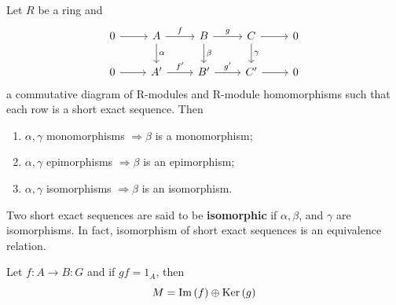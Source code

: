 \documentclass[12pt, oneside]{book}
\begin{document}
\begin{theorem}
    Let $R$ be a ring and
    \begin{equation*}
        \begin{tikzcd}
            0 \arrow[r] & A \arrow[r, "f"] \arrow[d,"\alpha"] & B \arrow[r, "g"] \arrow[d,"\beta"] & C \arrow[r] \arrow[d, "\gamma"] & 0 \\
            0 \arrow[r] & A' \arrow[r, "f'"] & B' \arrow[r, "g'"]   & C' \arrow[r]       & 0
        \end{tikzcd}
    \end{equation*}
    a commutative diagram of R-modules and R-module homomorphisms such that each row is a short exact sequence. Then
    \begin{enumerate}
        \item
              $\alpha, \gamma$ monomorphisms $\Rightarrow \beta$ is a monomorphism;

        \item
              $\alpha, \gamma$ epimorphisms $\Rightarrow \beta$ is an epimorphism;

        \item
              $\alpha, \gamma$ isomorphisms $\Rightarrow \beta$ is an isomorphism.
    \end{enumerate}
    \begin{remark}
        Two short exact sequences are said to be \textbf{isomorphic} if $\alpha, \beta$, and $\gamma$ are isomorphisms.
        In fact, isomorphism of short exact sequences is an equivalence relation.
    \end{remark}
\end{theorem}








\begin{lemma}
    Let $f:A\rightarrow B:G$ and if $gf=1_A$, then
    \begin{equation*}
        M=\Im\left( f \right)\oplus\operatorname{\operatorname{Ker}}\left( g \right)
    \end{equation*}
\end{lemma}
\end{document}

